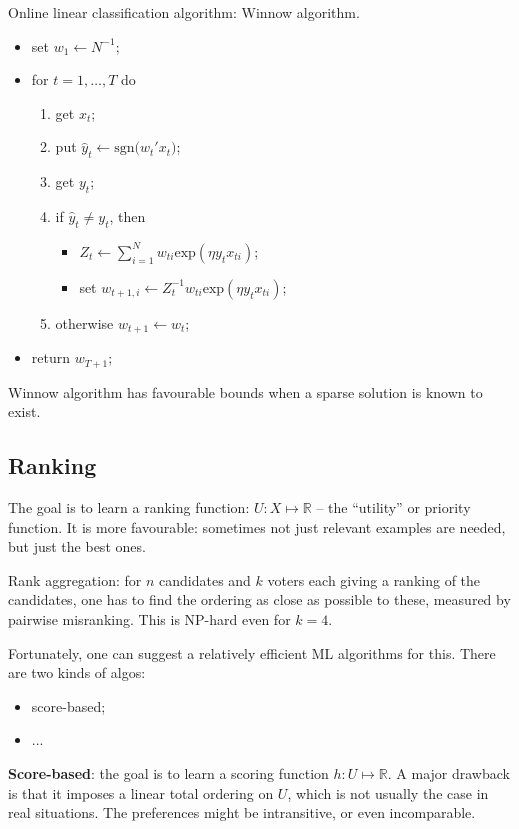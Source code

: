 \documentclass[a4paper]{article}
\newcommand{\Real}{\mathbb{R}}
\begin{document}
Online linear classification algorithm: Winnow algorithm.
\begin{itemize}
    \item set $w_1\leftarrow N^{-1}$;
    \item for $t=1,\ldots, T$ do \begin{enumerate}
        \item get $x_t$;
        \item put $\hat{y}_t \leftarrow \text{sgn}\bigl(w_t' x_t\bigr)$;
        \item get $y_t$;
        \item if $\hat{y}_t\neq y_t$, then \begin{itemize}
            \item $Z_t \leftarrow \sum_{i=1}^N w_{ti} \text{exp}(\eta y_t x_{ti})$;
            \item set $w_{t+1,i} \leftarrow Z_t^{-1} w_{ti} \text{exp}(\eta y_t x_{ti})$;
        \end{itemize}
        \item otherwise $w_{t+1} \leftarrow w_t$;
    \end{enumerate}
    \item return $w_{T+1}$;
\end{itemize}
Winnow algorithm has favourable bounds when a sparse solution is known to exist.

\subsection{Ranking} %
\label{sub:ranking}

The goal is to learn a ranking function: $U:X\mapsto\Real$ -- the ``utility'' or
priority function. It is more favourable: sometimes not just relevant examples are
needed, but just the best ones.

Rank aggregation: for $n$ candidates and $k$ voters each giving a ranking of the
candidates, one has to find the ordering as close as possible to these, measured
by pairwise misranking. This is NP-hard even for $k=4$.

Fortunately, one can suggest a relatively efficient ML algorithms for this.
There are two kinds of algos:\begin{itemize}
    \item score-based;
    \item ...
\end{itemize}

\textbf{Score-based}: the goal is to learn a scoring function $h:U\mapsto\Real$.
A major drawback is that it imposes a linear total ordering on $U$, which is not
usually the case in real situations. The preferences might be intransitive, or even
incomparable.
\end{document}
